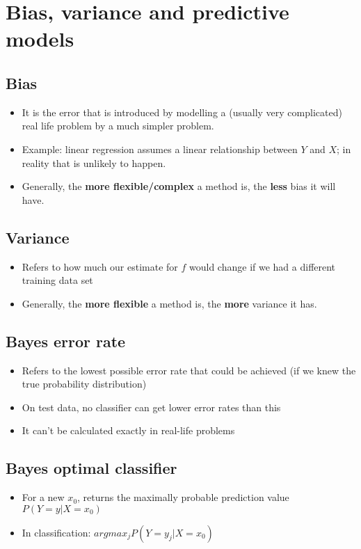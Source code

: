 \documentclass{article}
\begin{document}
    \newpage

\section{Bias, variance and predictive models}
    \subsection{Bias}
    \begin{itemize}
        \item It is the error that is introduced by modelling a (usually very complicated) real life problem by a much simpler problem.
        \item Example: linear regression assumes a linear relationship between $Y$ and $X$; in reality that is unlikely to happen.
        \item Generally, the \textbf{more flexible/complex} a method is, the \textbf{less} bias it will have.
    \end{itemize}

    \subsection{Variance}
    \begin{itemize}
        \item Refers to how much our estimate for $f$ would change if we had a different training data set
        \item Generally, the \textbf{more flexible} a method is, the \textbf{more} variance it has.
    \end{itemize}

    \subsection{Bayes error rate}
    \begin{itemize}
        \item Refers to the lowest possible error rate that could be achieved (if we knew the true probability distribution)
        \item On test data, no classifier can get lower error rates than this
        \item It can't be calculated exactly in real-life problems
    \end{itemize}

    \subsection{Bayes optimal classifier}
    \begin{itemize}
        \item For a new $x_0$, returns the maximally probable prediction value \\ $P(Y=y \vert X=x_0)$
        \item In classification: $argmax_j P(Y=y_j \vert X=x_0)$
    \end{itemize}
\end{document}
